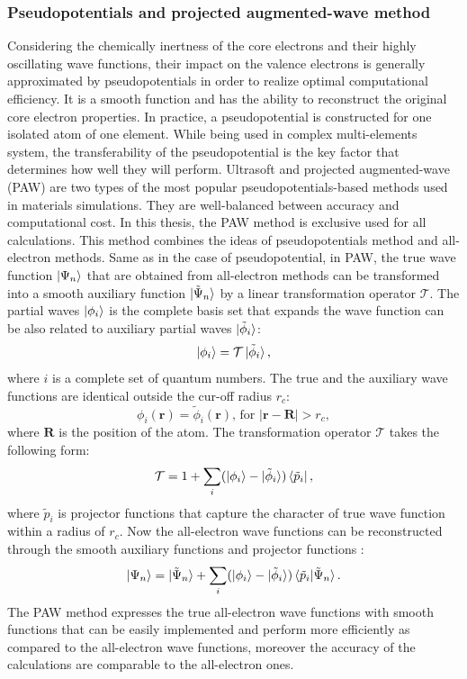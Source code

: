 \subsubsection{Pseudopotentials and projected augmented-wave method}
Considering the chemically inertness of the core electrons and their highly oscillating wave functions, their impact on the valence electrons is generally approximated by pseudopotentials in order to realize optimal computational efficiency. It is a smooth function and has the ability to reconstruct the original core electron properties. In practice, a pseudopotential is constructed for one isolated atom of one element. While being used in complex multi-elements system, the transferability of the pseudopotential is the key factor that determines how well they will perform. Ultrasoft \cite{Ultrasoft1} and projected augmented-wave (PAW) \cite{PAW1,Kresse1999} are two types of the most popular pseudopotentials-based methods used in materials simulations. They are well-balanced between accuracy and computational cost. In this thesis, the PAW method is exclusive used for all calculations. This method combines the ideas of pseudopotentials method and all-electron methods. Same as in the case of pseudopotential, in PAW, the true wave function $\ket{\Psi_n}$ that are obtained from all-electron methods can be transformed into a smooth auxiliary function $\ket{\tilde{\Psi}_n}$ by a linear transformation operator $\mathcal{T}$. The partial waves $\ket{\phi_i}$ is the complete basis set that expands the wave function can be also related to auxiliary partial waves $\ket{\tilde{\phi}_i}$:
\begin{equation}
\ket{\phi_i}=\mathcal{T}\ket{\tilde{\phi}_i},
\end{equation}
where $i$ is a complete set of quantum numbers. The true and the auxiliary wave functions are identical outside the cur-off radius $r_c$:
\begin{equation}
\phi_i(\mathbf{r})=\tilde{\phi}_i(\mathbf{r})\text{, for }|\mathbf{r}-\mathbf{R}|>r_c,
\end{equation}
where $\mathbf{R}$ is the position of the atom. The transformation operator $\mathcal{T}$ takes the following form:
\begin{equation}
\mathcal{T}=1+\sum_i(\ket{\phi_i}-\ket{\tilde{\phi}_i})\bra{\tilde{p}_i},
\end{equation}
where $\tilde{p}_i$ is projector functions that capture the character of true wave function within a radius of $r_c$. Now the all-electron wave functions can be reconstructed through the smooth auxiliary functions and projector functions :
\begin{equation}
\ket{\Psi_n}=\ket{\tilde{\Psi}_n}+\sum_i(\ket{\phi_i}-\ket{\tilde{\phi}_i})\braket{\tilde{p}_i|\tilde{\Psi}_n}.
\end{equation}
The PAW method expresses the true all-electron wave functions with smooth functions that can be easily implemented and perform more efficiently as compared to the all-electron wave functions, moreover the accuracy of the calculations are comparable to the all-electron ones.
